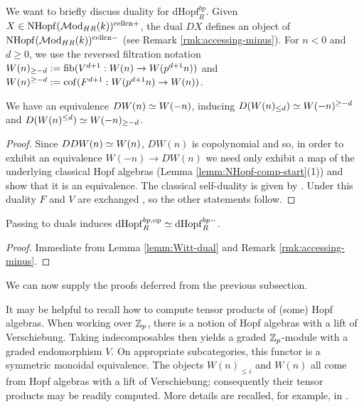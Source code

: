 \documentclass{amsart}
\numberwithin{proposition}{section}
\numberwithin{equation}{section}
\def\cell{\mathrm{cell}}
\def\NHopf{\mathrm{NHopf}}
\def\dHopf{\mathrm{dHopf}}
\def\cn{\mathrm{cn}}
\begin{document}
We want to briefly discuss duality for $\dHopf_R^{bp}$.
Given $X \in \NHopf(\Mod_{HR}(k))^{\cell\cn+}$, the dual $DX$ defines an object of $\NHopf(\Mod_{HR}(k))^{\cell\cn-}$ (see Remark \ref{rmk:accessing-minus}).
For $n<0$ and $d\ge0$, we use the reversed filtration notation $W(n)_{\ge -d} := \mathrm{fib}(V^{d+1}: W(n) \to W(p^{d+1}n))$ and $W(n)^{\ge -d} := \operatorname{cof}(F^{d+1}: W(p^{d+1}n) \to W(n))$.
\begin{lemma} \label{lemm:Witt-dual}
We have an equivalence $DW(n) \simeq W(-n)$, inducing $D(W(n)_{\le d}) \simeq W(-n)^{\ge -d}$ and $D(W(n)^{\le d}) \simeq W(-n)_{\ge -d}$.
\end{lemma}
\begin{proof}
Since $DDW(n) \simeq W(n)$, $DW(n)$ is copolynomial and so, in order to exhibit an equivalence $W(-n) \to DW(n)$ we need only exhibit a map of the underlying classical Hopf algebras (Lemma \ref{lemm:NHopf-comp-start}(1)) and show that it is an equivalence.
The classical self-duality is given by \cite[Propositions~(7.2) and~(8.3)]{husemoller-hopf}.
Under this duality $F$ and $V$ are exchanged \cite[Theorem~13.48, equation~(13.56)]{hazewinkel-witt-vectors}, so the other statements follow.
\end{proof}

\begin{corollary}
Passing to duals induces $\dHopf_R^{bp,\op} \wequi \dHopf_R^{bp-}$.
\end{corollary}
\begin{proof}
Immediate from Lemma \ref{lemm:Witt-dual} and Remark \ref{rmk:accessing-minus}.
\end{proof}

We can now supply the proofs deferred from the previous subsection.
\begin{remark} \label{rmk:hotimes-howto}
It may be helpful to recall how to compute tensor products of (some) Hopf algebras.
When working over $\mathbb{Z}_p$, there is a notion of Hopf algebras with a lift of Verschiebung.
Taking indecomposables then yields a graded $\mathbb{Z}_p$-module with a graded endomorphism $V$.
On appropriate subcategories, this functor is a symmetric monoidal equivalence.
The objects $W(n)_{\le i}$ and $W(n)$ all come from Hopf algebras with a lift of Verschiebung; consequently their tensor products may be readily computed.
More details are recalled, for example, in \cite[\S2.4.5]{bachmann-wilson}.
\end{remark}
\end{document}
